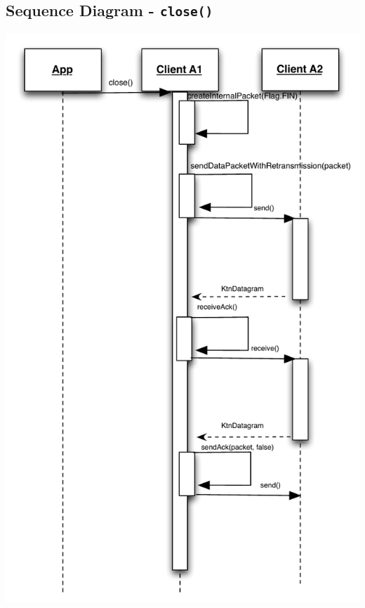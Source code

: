 \documentclass{article}
\begin{document}
\subsection{Sequence Diagram - \texttt{close()}}
\includegraphics[scale=0.95]{ktnClientClose.pdf}
\end{document}
